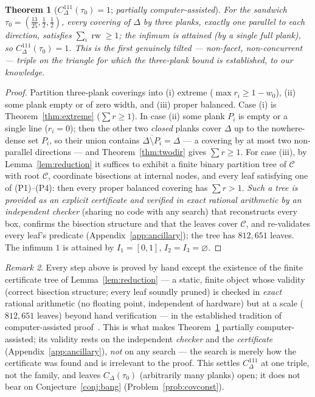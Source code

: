 \documentclass{aims}
\numberwithin{equation}{section}
\theoremstyle{plain}
\newtheorem{theorem}{Theorem}[section]
\theoremstyle{definition}
\theoremstyle{remark}
\newtheorem{remark}[theorem]{Remark}
\newcommand{\rw}{\operatorname{rw}}
\begin{document}
\begin{theorem}[$C^{111}_\Delta(\tau_0)=1$; \emph{partially computer-assisted}]
\label{thm:sandwichbang}
For the sandwich $\tau_0=(\tfrac{13}{25},\tfrac12,\tfrac12)$, every covering of
$\Delta$ by three planks, exactly one parallel to each direction, satisfies
$\sum_i\rw\ge1$; the infimum is attained (by a single full plank), so
$C^{111}_\Delta(\tau_0)=1$. This is the first genuinely tilted --- non-facet,
non-concurrent --- triple on the triangle for which the three-plank bound is
established, to our knowledge.
\end{theorem}
\begin{proof}
Partition three-plank coverings into (i) extreme ($\max r_i\ge1-w_0$), (ii)
some plank empty or of zero width, and (iii) proper balanced. Case (i) is
Theorem~\ref{thm:extreme} ($\sum r\ge1$). In case (ii) some plank $P_i$ is empty
or a single line ($r_i=0$); then the other two \emph{closed} planks cover
$\Delta$ up to the nowhere-dense set $P_i$, so their union contains
$\overline{\Delta\setminus P_i}=\Delta$ --- a covering by at most two
non-parallel directions --- and Theorem~\ref{thm:twodir} gives $\sum r\ge1$.
For case (iii), by Lemma~\ref{lem:reduction} it suffices to exhibit a finite
binary partition tree of $\mathcal C$ with root $\mathcal C$, coordinate
bisections at internal nodes, and every leaf satisfying one of (P1)--(P4):
then every proper balanced covering has $\sum r>1$. \emph{Such a tree is
provided as an explicit certificate and verified in exact rational arithmetic
by an independent checker} (sharing no code with any search) that reconstructs
every box, confirms the bisection structure and that the leaves cover
$\mathcal C$, and re-validates every leaf's predicate
(Appendix~\ref{app:ancillary}); the tree has $812{,}651$ leaves. The infimum
$1$ is attained by $I_1=[0,1]$, $I_2=I_3=\varnothing$.
\end{proof}

\begin{remark}\label{rem:boundary}
Every step above is proved by hand except the existence of the finite
certificate tree of Lemma~\ref{lem:reduction} --- a static, finite object whose
validity (correct bisection structure; every leaf soundly pruned) is checked
in \emph{exact} rational arithmetic (no floating point, independent of
hardware) but at a scale ($812{,}651$ leaves) beyond hand verification --- in the
established tradition of computer-assisted proof~\cite{AppelHaken77,Hales17,HKM16,mathlib20}.
This is
what makes Theorem~\ref{thm:sandwichbang} partially computer-assisted; its
validity rests on the independent \emph{checker} and the \emph{certificate}
(Appendix~\ref{app:ancillary}), \emph{not} on any search --- the search is
merely how the certificate was found and is irrelevant to the proof. This
settles $C^{111}_\Delta$ at one triple, not the family, and leaves
$C_\Delta(\tau_0)$ (arbitrarily many planks) open; it does not bear on
Conjecture~\ref{conj:bang} (Problem~\ref{prob:covconst}).
\end{remark}
\end{document}
